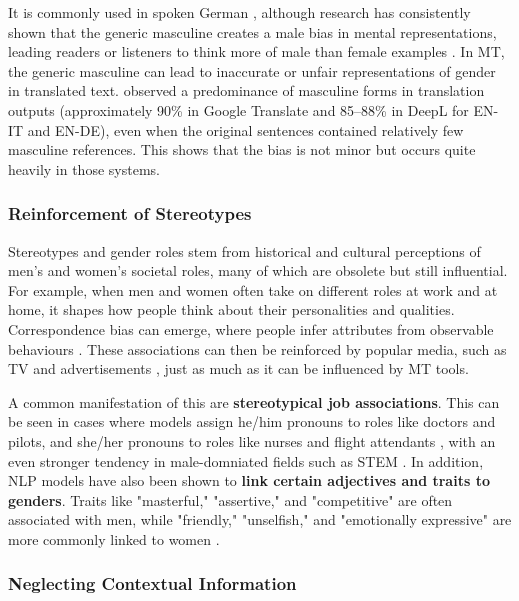 It is commonly used in spoken German \citep{lardelliBuildingBridgesDataset2024,schmitzGermanAllProfessors2022}, although research has consistently shown that the generic masculine creates a male bias in mental representations, leading readers or listeners to think more of male than female examples \citep{sczesnyCanGenderFairLanguage2016}. In MT, the generic masculine can lead to inaccurate or unfair representations of gender in translated text. \citet{rescignoGenderBiasMachine2023} observed a predominance of masculine forms in translation outputs (approximately 90\% in Google Translate and 85–88\% in DeepL for EN-IT and EN-DE), even when the original sentences contained relatively few masculine references. This shows that the bias is not minor but occurs quite heavily in those systems.


\subsubsection{Reinforcement of Stereotypes}
Stereotypes and gender roles stem from historical and cultural perceptions of men's and women's societal roles, many of which are obsolete but still influential. For example, when men and women often take on different roles at work and at home, it shapes how people think about their personalities and qualities. Correspondence bias can emerge, where people infer attributes from observable behaviours \citep{godsilEffectsGenderRoles2016}. These associations can then be reinforced by popular media, such as TV and advertisements \citep{godsilEffectsGenderRoles2016}, just as much as it can be influenced by MT tools.

A common manifestation of this are \textbf{stereotypical job associations}. This can be seen in cases where models assign he/him pronouns to roles like doctors and pilots, and she/her pronouns to roles like nurses and flight attendants \citep{shresthaExploringGenderBiases2022}, with an even stronger tendency in male-domniated fields such as STEM \citep{pratesAssessingGenderBias2019}. In addition, NLP models have also been shown to \textbf{link certain adjectives and traits to genders}. Traits like "masterful," "assertive," and "competitive" are often associated with men, while "friendly," "unselfish," and "emotionally expressive" are more commonly linked to women \citep{godsilEffectsGenderRoles2016}.

\subsubsection{Neglecting Contextual Information}


